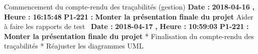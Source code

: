 \documentclass{article}%
\begin{document}
\newline%
%
Commencement du compte{-}rendu des traçabilités (gestion)\newline%
\newline%
%
\textbf{Date : }%
\textbf{2018{-}04{-}16}%
\textbf{,}%
\textbf{ Heure : }%
\textbf{16:15:48}%
\newline%
%
\textbf{P1{-}221 }%
\textbf{ : }%
\textbf{ Monter la présentation finale du projet }%
\newline%
\newline%
%
Aider à faire les rapports de test~\newline%
\newline%
%
\textbf{Date : }%
\textbf{2018{-}04{-}17}%
\textbf{,}%
\textbf{ Heure : }%
\textbf{10:59:03}%
\newline%
%
\textbf{P1{-}221 }%
\textbf{ : }%
\textbf{ Monter la présentation finale du projet }%
\newline%
\newline%
%
* Finalisation du compte{-}rendu des traçabilités\newline%
 * Réajuster les diagrammes UML\newline%
\newline%
%
\newpage

%
\end{document}
